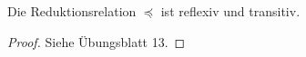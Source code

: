 \begin{Satz}
	Die Reduktionsrelation $\preceq$ ist reflexiv und transitiv.
\end{Satz}

\begin{proof}
	Siehe Übungsblatt 13.
\end{proof}

% 
% 
% 
% 
% 
% 
% 
